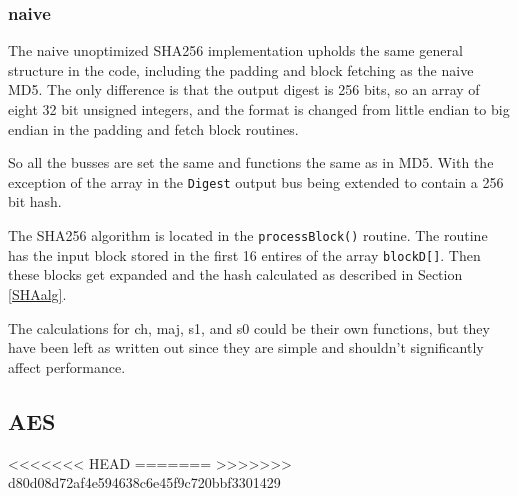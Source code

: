 \documentclass[a4paper]{article}
\begin{document}
\begin{enumerate}
\subsubsection{naive}
\label{AESnaive}
The naive unoptimized SHA256 implementation upholds the same general structure in the code, including the padding and block fetching as the naive MD5.
The only difference is that the output digest is 256 bits, so an array of eight 32 bit unsigned integers,
and the format is changed from little endian to big endian in the padding and fetch block routines.

So all the busses are set the same and functions the same as in MD5. With the exception of the array in the \texttt{Digest} output bus being extended to contain a 256 bit hash.

The SHA256 algorithm is located in the \texttt{processBlock()} routine.
The routine has the input block stored in the first 16 entires of the array \texttt{blockD[]}.
Then these blocks get expanded and the hash calculated as described in Section \ref{SHAalg}.

The calculations for ch, maj, s1, and s0 could be their own functions, but they have been left as written out since they are simple and shouldn't significantly affect performance.
\subsection{AES}
<<<<<<< HEAD
\label{sec:org2426e3c}
=======
\label{sec:orgf1cb728}
>>>>>>> d80d08d72af4e594638c6e45f9c720bbf3301429


\end{enumerate}
\end{document}

